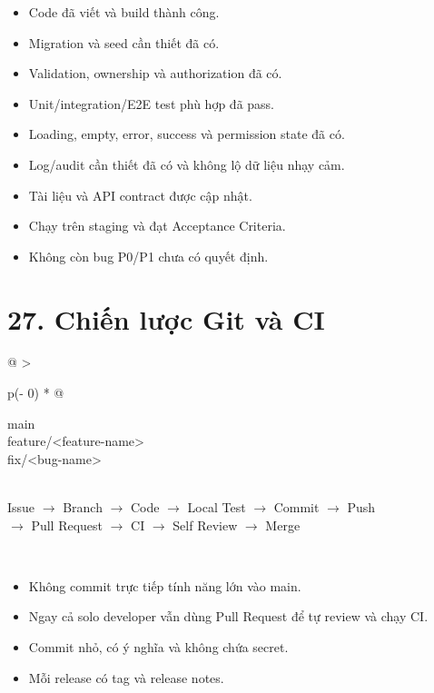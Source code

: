 \documentclass[
  11pt,
  a4paper,
]{article}
\begin{document}
\begin{itemize}
\item
  Code đã viết và build thành công.
\item
  Migration và seed cần thiết đã có.
\item
  Validation, ownership và authorization đã có.
\item
  Unit/integration/E2E test phù hợp đã pass.
\item
  Loading, empty, error, success và permission state đã có.
\item
  Log/audit cần thiết đã có và không lộ dữ liệu nhạy cảm.
\item
  Tài liệu và API contract được cập nhật.
\item
  Chạy trên staging và đạt Acceptance Criteria.
\item
  Không còn bug P0/P1 chưa có quyết định.
\end{itemize}

\section{27. Chiến lược Git và
CI}\label{chiux1ebfn-lux1b0ux1ee3c-git-vuxe0-ci}

\begin{longtable}[]{@{}
  >{\raggedright\arraybackslash}p{(\columnwidth - 0\tabcolsep) * }@{}}
\toprule\noalign{}
\begin{minipage}[b]{\linewidth}\raggedright
main\\
feature/\textless feature-name\textgreater{}\\
fix/\textless bug-name\textgreater{}\\
\strut \\
Issue \(\rightarrow\) Branch \(\rightarrow\) Code \(\rightarrow\) Local Test \(\rightarrow\) Commit \(\rightarrow\) Push\\
\(\rightarrow\) Pull Request \(\rightarrow\) CI \(\rightarrow\) Self Review \(\rightarrow\) Merge\strut
\end{minipage} \\
\midrule\noalign{}
\endhead
\bottomrule\noalign{}
\endlastfoot
\end{longtable}

\begin{itemize}
\item
  Không commit trực tiếp tính năng lớn vào main.
\item
  Ngay cả solo developer vẫn dùng Pull Request để tự review và chạy CI.
\item
  Commit nhỏ, có ý nghĩa và không chứa secret.
\item
  Mỗi release có tag và release notes.
\end{itemize}
\end{document}

